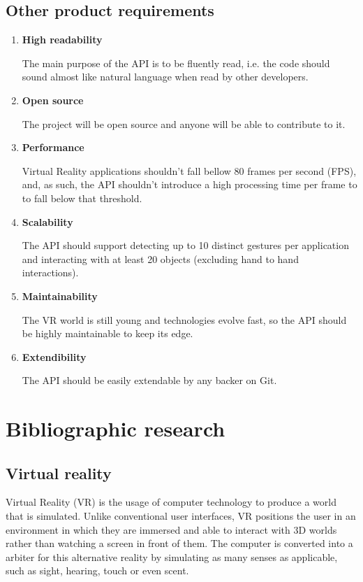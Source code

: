 \documentclass[12pt,a4paper,twoside]{report}
\begin{document}
\section{Other product requirements}

\begin{enumerate}
  \item \textbf{High readability}
    
    The main purpose of the API is to be fluently read, i.e. the code should sound almost like natural language when read by other developers.

  \item \textbf{Open source}
  
    The project will be open source and anyone will be able to contribute to it.

  \item \textbf{Performance}

    Virtual Reality applications shouldn’t fall bellow 80 frames per second (FPS), and, as such, the API shouldn’t introduce a high processing time per frame to to fall below that threshold.

  \item \textbf{Scalability}
    
    The API should support detecting up to 10 distinct gestures per application and interacting with at least 20 objects (excluding hand to hand interactions).

  \item \textbf{Maintainability}

    The VR world is still young and technologies evolve fast, so the API should be highly maintainable to keep its edge.

  \item \textbf{Extendibility}
    
    The API should be easily extendable by any backer on Git.

\end{enumerate}

\chapter{Bibliographic research}

\section{Virtual reality}

Virtual Reality (VR) is the usage of computer technology to produce a world that is simulated. Unlike conventional user interfaces, VR positions the user in an environment in which they are immersed and able to interact with 3D worlds rather than watching a screen in front of them. The computer is converted into a arbiter for this alternative reality by simulating as many senses as applicable, such as sight, hearing, touch or even scent.
\end{document}
